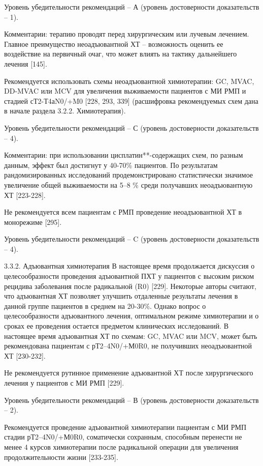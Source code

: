 Уровень убедительности рекомендаций – А (уровень достоверности доказательств – 1).

Комментарии: терапию проводят перед хирургическим или лучевым лечением. Главное преимущество неоадъювантной ХТ – возможность оценить ее воздействие на первичный очаг, что может влиять на тактику дальнейшего лечения [145].

Рекомендуется использовать схемы неоадъювантной химиотерапии: GC, MVAC, DD-MVAC или MCV для увеличения выживаемости пациентов с МИ РМП и стадией сТ2-Т4аN0/+M0 [228, 293, 339] (расшифровка рекомендуемых схем дана в начале раздела 3.2.2. Химиотерапия).

Уровень убедительности рекомендаций – С (уровень достоверности доказательств – 4).

Комментарии: при использовании цисплатин**-содержащих схем, по разным данным, эффект был достигнут у 40-70\% пациентов. По результатам рандомизированных исследований продемонстрировано статистически значимое увеличение общей выживаемости на 5–8 \% среди получавших неоадъювантную ХТ [223-228].

Не рекомендуется всем пациентам с РМП проведение неоадъювантной ХТ в монорежиме [295].

Уровень убедительности рекомендаций – C (уровень достоверности доказательств – 4).

3.3.2. Адъювантная химиотерапия
В настоящее время продолжается дискуссия о целесообразности проведения адъювантной ПХТ у пациентов с высоким риском рецидива заболевания после радикальной (R0) [229]. Некоторые авторы считают, что адъювантная ХТ позволяет улучшить отдаленные результаты лечения в данной группе пациентов в среднем на 20-30\%. Однако вопрос о целесообразности адъювантного лечения, оптимальном режиме химиотерапии и о сроках ее проведения остается предметом клинических исследований. В настоящее время адъювантная ХТ по схемам: GC, MVAC или MCV, может быть рекомендована пациентам с рТ2–4N0/+М0R0, не получивших неоадъювантной ХТ [230-232].

Не рекомендуется рутинное применение адъювантной ХТ после хирургического лечения у пациентов с МИ РМП [229].

Уровень убедительности рекомендаций – В (уровень достоверности доказательств – 2).

Рекомендуется проведение адъювантной химиотерапии пациентам с МИ РМП стадии рТ2–4N0/+М0R0, соматически сохранным, способным перенести не менее 4 курсов химиотерапии после радикальной операции для увеличения продолжительности жизни [233-235].

